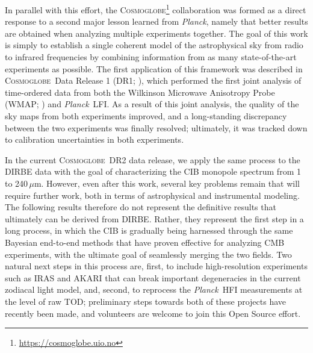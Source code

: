 \documentclass{aa}
\def\Cosmoglobe{\textsc{Cosmoglobe}}
\def\Planck{\textit{Planck}}
\newcommand{\cosmoglobe}{\textsc{Cosmoglobe}}
\begin{document}
In parallel with this effort, the \Cosmoglobe\footnote{\url{https://cosmoglobe.uio.no}} collaboration was formed as a direct response to a second major lesson learned from \Planck, namely that better results are obtained when analyzing multiple experiments together. The goal of this work is simply to establish a single coherent model of the astrophysical sky from radio to infrared frequencies by combining information from as many state-of-the-art experiments as possible. The first application of this framework was described in \cosmoglobe\ Data Release 1 (DR1; \citealp{watts2023_dr1}), which performed the first joint analysis of time-ordered data from both the Wilkinson Microwave Anisotropy Probe (WMAP; \citealp{bennett2012}) and \Planck\ LFI. As a result of this joint analysis, the quality of the sky maps from both experiments improved, and a long-standing discrepancy between the two experiments was finally resolved; ultimately, it was tracked down to calibration uncertainties in both experiments.

In the current \cosmoglobe\ DR2 data release, we apply the same process to the DIRBE data with the goal of characterizing the CIB monopole spectrum from 1 to 240$\,\mu\mathrm{m}$. However, even after this work, several key problems remain that will require further work, both in terms of astrophysical and instrumental modeling. The following results therefore do not represent the definitive results that ultimately can be derived from DIRBE. Rather, they represent the first step in a long process, in which the CIB is gradually being harnessed through the same Bayesian end-to-end methods that have proven effective for analyzing CMB experiments, with the ultimate goal of seamlessly merging the two fields. Two natural next steps in this process are, first, to include high-resolution experiments such as IRAS \citep{neugebauer:1984} and AKARI \citep{murakami:2007} that can break important degeneracies in the current zodiacal light model, and, second, to reprocess the \Planck\ HFI measurements at the level of raw TOD; preliminary steps towards both of these projects have recently been made, and volunteers are welcome to join this Open Source effort.

\end{document}
